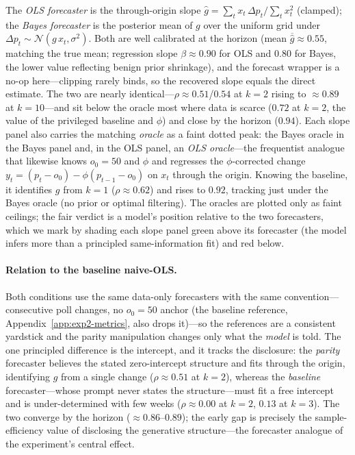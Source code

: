 The \emph{OLS forecaster} is the through-origin slope $\hat g=\sum_t x_t\,\Delta p_t/\sum_t x_t^2$
(clamped); the \emph{Bayes forecaster} is the posterior mean of $g$ over the uniform grid under
$\Delta p_t\sim\mathcal N(g\,x_t,\sigma^2)$.  Both are well calibrated at the horizon (mean
$\overline{\hat g}\approx0.55$, matching the true mean; regression slope $\beta\approx0.90$ for OLS
and $0.80$ for Bayes, the lower value reflecting benign prior shrinkage), and the forecast wrapper is
a no-op here---clipping rarely binds, so the recovered slope equals the direct estimate.  The two are
nearly identical---$\rho\approx0.51$/$0.54$ at $k{=}2$ rising to $\approx0.89$ at $k{=}10$---and sit
below the oracle most where data is scarce ($0.72$ at $k{=}2$, the value of the privileged baseline
and $\phi$) and close by the horizon ($0.94$).  Each slope panel also carries the matching
\emph{oracle} as a faint dotted peak: the Bayes oracle in the Bayes panel and, in the OLS panel, an
\emph{OLS oracle}---the frequentist analogue that likewise knows $o_0{=}50$ and $\phi$ and regresses
the $\phi$-corrected change $y_t=(p_t-o_0)-\phi(p_{t-1}-o_0)$ on $x_t$ through the origin.  Knowing
the baseline, it identifies $g$ from $k{=}1$ ($\rho\approx0.62$) and rises to $0.92$, tracking just
under the Bayes oracle (no prior or optimal filtering).  The oracles are plotted only as faint
ceilings; the fair verdict is a model's position relative to the two forecasters, which we mark by
shading each slope panel green above its forecaster (the model infers more than a principled
same-information fit) and red below.

\paragraph{Relation to the baseline naive-OLS.}  Both conditions use the same data-only forecasters
with the same convention---consecutive poll changes, no $o_0{=}50$ anchor (the baseline reference,
Appendix~\ref{app:exp2-metrics}, also drops it)---so the references are a consistent yardstick and
the parity manipulation changes only what the \emph{model} is told.  The one principled difference is
the intercept, and it tracks the disclosure: the \emph{parity} forecaster believes the stated
zero-intercept structure and fits through the origin, identifying $g$ from a single change
($\rho\approx0.51$ at $k{=}2$), whereas the \emph{baseline} forecaster---whose prompt never states
the structure---must fit a free intercept and is under-determined with few weeks
($\rho\approx0.00$ at $k{=}2$, $0.13$ at $k{=}3$).  The two converge by the horizon
($\approx0.86$--$0.89$); the early gap is precisely the sample-efficiency value of disclosing the
generative structure---the forecaster analogue of the experiment's central effect.

